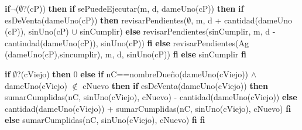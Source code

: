 \documentclass[10pt, a4paper]{article}
\newcommand{\tab}{\hspace*{5mm}}
\begin{document}
\begin{tad}{}


{\addtolength{\leftskip}{20 mm}
\noindent \textbf{if}$\neg$($\emptyset$?(cP)) \textbf{then} \newline
 \tab \textbf{if} sePuedeEjecutar(m, d, dameUno(cP)) \textbf{then} \newline
\tab \tab \textbf{if} esDeVenta(dameUno(cP)) \textbf{then} \newline 
\tab \tab \tab  revisarPendientes($\emptyset$, m, d + cantidad(dameUno (cP)), sinUno(cP) $\cup$ sinCumplir) \newline \tab \tab \textbf{else} \newline
\tab \tab \tab revisarPendientes(sinCumplir, m, d - cantindad(dameUno(cP)), sinUno(cP)) \newline 
\tab \tab \textbf{fi} \newline
\tab \textbf{else} \newline
\tab \tab revisarPendientes(Ag (dameUno(cP),sincumplir), m, d, sinUno(cP)) \newline
\tab \textbf{fi} \newline 
\noindent \textbf{else} \newline
\tab sinCumplir\newline
\textbf{fi}

}

{\addtolength{\leftskip}{20 mm}
\noindent \textbf{if} $\emptyset$?(cViejo) \textbf{then} \newline
\tab 0 \newline
\noindent \textbf{else} \newline
 \tab \textbf{if} nC==nombreDue\~no(dameUno(cViejo)) $\land$ dameUno(cViejo) $\notin$ cNuevo  \textbf{then}  \newline
\tab \tab \textbf{if} esDeVenta(dameUno(cViejo))  \textbf{then} \newline
\tab \tab \tab sumarCumplidas(nC, sinUno(cViejo), cNuevo) - cantidad(dameUno(cViejo)) \newline
\tab \tab \textbf{else} \newline
\tab \tab \tab cantidad(dameUno(cViejo)) + sumarCumplidas(nC, sinUno(cViejo), cNuevo) \newline 
\tab \tab \textbf{fi} \newline
\tab \textbf{else} \newline
\tab \tab  sumarCumplidas(nC, sinUno(cViejo), cNuevo) \newline
\tab \textbf{fi} \newline 
\noindent \textbf{fi}

}
\end{tad}
\end{document}
